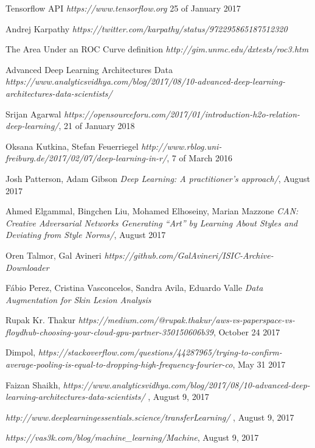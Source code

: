 \documentclass[titlepage,openright,twoside,a4paper,
final,12pt,english]{book}
\begin{document}
\begin{thebibliography}{9}
  Tensorflow API
{\em https://www.tensorflow.org} 25 of January 2017

  Andrej Karpathy 
{\em https://twitter.com/karpathy/status/972295865187512320}

 The Area Under an ROC Curve definition 
{\em http://gim.unmc.edu/dxtests/roc3.htm}

 Advanced Deep Learning Architectures Data
{\em https://www.analyticsvidhya.com/blog/2017/08/10-advanced-deep-learning-architectures-data-scientists/}

 
  Srijan Agarwal
{\em https://opensourceforu.com/2017/01/introduction-h2o-relation-deep-learning/}, 21 of January 2018
 
  Oksana Kutkina, Stefan Feuerriegel
{\em http://www.rblog.uni-freiburg.de/2017/02/07/deep-learning-in-r/}, 7 of March 2016 
 
  Josh Patterson, Adam Gibson
{\em Deep Learning: A practitioner's approach/}, August 2017

 Ahmed Elgammal, Bingchen Liu, Mohamed Elhoseiny, Marian Mazzone {\em CAN: Creative Adversarial Networks Generating “Art” by Learning About Styles and Deviating from Style Norms/}, August 2017

 Oren Talmor, Gal Avineri {\em https://github.com/GalAvineri/ISIC-Archive-Downloader}

 Fábio Perez, Cristina Vasconcelos, Sandra Avila, Eduardo Valle {\em Data Augmentation for Skin Lesion Analysis}


 Rupak Kr. Thakur {\em https://medium.com/@rupak.thakur/aws-vs-paperspace-vs-floydhub-choosing-your-cloud-gpu-partner-350150606b39}, October 24 2017

 Dimpol, {\em https://stackoverflow.com/questions/44287965/trying-to-confirm-average-pooling-is-equal-to-dropping-high-frequency-fourier-co}, May 31 2017

 Faizan Shaikh, {\em https://www.analyticsvidhya.com/blog/2017/08/10-advanced-deep-learning-architectures-data-scientists/
}, August 9, 2017


 {\em http://www.deeplearningessentials.science/transferLearning/
}, August 9, 2017

 {\em https://vas3k.com/blog/machine\_learning/Machine}, August 9, 2017




\end{thebibliography}
\end{document}
